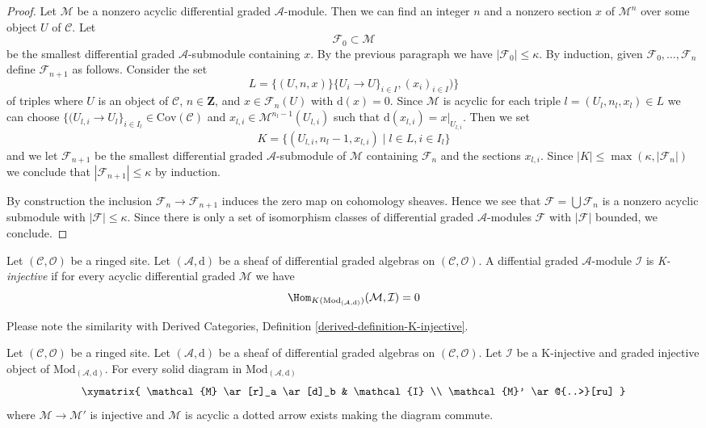 \begin{proof}
\medskip\noindent
Let $\mathcal{M}$ be a nonzero acyclic differential graded
$\mathcal{A}$-module. Then we can find an integer $n$ and a
nonzero section $x$ of $\mathcal{M}^n$ over some object $U$
of $\mathcal{C}$. Let
$$
\mathcal{F}_0 \subset \mathcal{M}
$$
be the smallest differential graded $\mathcal{A}$-submodule
containing $x$. By the previous paragraph we have
$|\mathcal{F}_0| \leq \kappa$. By induction, given
$\mathcal{F}_0, \ldots, \mathcal{F}_n$ define
$\mathcal{F}_{n + 1}$ as follows. Consider the set
$$
L = \{(U, n, x)\}
\{U_i \to U\}_{i \in I}, (x_i)_{i \in I})\}
$$
of triples where $U$ is an object of $\mathcal{C}$, $n \in \mathbf{Z}$,
and $x \in \mathcal{F}_n(U)$ with $\text{d}(x) = 0$. Since
$\mathcal{M}$ is acyclic for each triple $l = (U_l, n_l, x_l) \in L$
we can choose
$\{(U_{l, i} \to U_l\}_{i \in I_l} \in \text{Cov}(\mathcal{C})$ and
$x_{l, i} \in \mathcal{M}^{n_l - 1}(U_{l, i})$ such that
$\text{d}(x_{l, i}) = x|_{U_{l, i}}$. Then we set
$$
K = \{(U_{l, i}, n_l - 1, x_{l, i}) \mid l \in L, i \in I_l\}
$$
and we let $\mathcal{F}_{n + 1}$ be the smallest differential
graded $\mathcal{A}$-submodule of $\mathcal{M}$ containing
$\mathcal{F}_n$ and the sections $x_{l, i}$.
Since $|K| \leq \max(\kappa, |\mathcal{F}_n|)$
we conclude that $|\mathcal{F}_{n + 1}| \leq \kappa$ by induction.

\medskip\noindent
By construction the inclusion $\mathcal{F}_n \to \mathcal{F}_{n + 1}$
induces the zero map on cohomology sheaves. Hence we see that
$\mathcal{F} = \bigcup \mathcal{F}_n$ is a nonzero acyclic submodule
with $|\mathcal{F}| \leq \kappa$. Since there is only a set
of isomorphism classes of differential graded $\mathcal{A}$-modules
$\mathcal{F}$ with $|\mathcal{F}|$ bounded, we conclude.
\end{proof}

\begin{definition}
\label{definition-K-injective}
Let $(\mathcal{C}, \mathcal{O})$ be a ringed site.
Let $(\mathcal{A}, \text{d})$ be a sheaf of differential graded algebras
on $(\mathcal{C}, \mathcal{O})$. A diffential graded $\mathcal{A}$-module
$\mathcal{I}$ is {\it K-injective} if for every acyclic
differential graded $\mathcal{M}$ we have 
$$
\Hom_{K(\text{Mod}_{(\mathcal{A}, \text{d})})}(\mathcal{M}, \mathcal{I}) = 0
$$
\end{definition}

\noindent
Please note the similarity with
Derived Categories, Definition \ref{derived-definition-K-injective}.

\begin{lemma}
\label{lemma-first-property-dg-injective}
Let $(\mathcal{C}, \mathcal{O})$ be a ringed site.
Let $(\mathcal{A}, \text{d})$
be a sheaf of differential graded algebras on $(\mathcal{C}, \mathcal{O})$.
Let $\mathcal{I}$ be a K-injective and graded injective
object of $\text{Mod}_{(\mathcal{A}, \text{d})}$.
For every solid diagram in $\text{Mod}_{(\mathcal{A}, \text{d})}$
$$
\xymatrix{
\mathcal{M} \ar[r]_a \ar[d]_b & \mathcal{I} \\
\mathcal{M}' \ar@{..>}[ru]
}
$$
where $\mathcal{M} \to \mathcal{M}'$ is injective and $\mathcal{M}$ is acyclic
a dotted arrow exists making the diagram commute.
\end{lemma}

